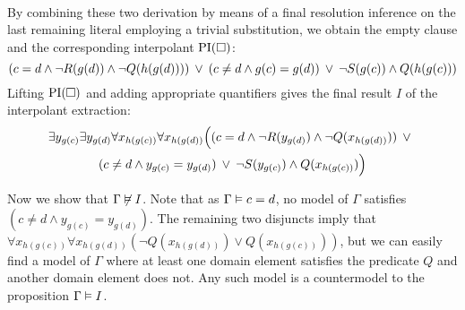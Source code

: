 \begin{exa}
{\begin{adjustwidth}{-1.5em}{0em}
\begin{prooftree}


		\end{prooftree}

		\end{adjustwidth}
	}
		~

	By combining these two derivation by means of a final resolution inference on the last remaining literal employing a trivial substitution, we obtain the empty clause and the corresponding interpolant $\operatorname{PI}(\square)$:
	\[
	(c=d \land \lnot R(g(d)) \land \lnot Q(h(g(d)))) \;\,{\lor}\;\, (c\neq d \land g(c) = g(d))  \;\,{\lor}\;\,\allowbreak
{\lnot S(g(c)) \land Q(h(g(c)))}\]
	Lifting $\operatorname{PI}(\square)$ and adding appropriate quantifiers gives the final result $I$ of the interpolant extraction:
	\begin{gather*}
		\exists y_{g(c)} \exists y_{g(d)} \forall x_{h(g(c))} \forall x_{h(g(d))} 
		\Big(
		(c=d \land \lnot R(y_{g(d)}) \land \lnot Q(x_{h(g(d))})) \;\,{\lor}\;\, \\
		(c\neq d \land y_{g(c)} = y_{g(d)})  \;\,{\lor}\;\,
		{\lnot S(y_{g(c)}) \land Q(x_{h(g(c))})}
		\Big)
	\end{gather*}

	Now we show that $\Gamma \not\vDash I$.
	Note that as $\Gamma \vDash c=d$, no model of $\Gamma$ satisfies $(c\neq d \land y_{g(c)} = y_{g(d)})$.
	The remaining two disjuncts imply that 
	$\forall x_{h(g(c))} \forall x_{h(g(d))} ( \lnot Q(x_{h(g(d))}) \lor Q(x_{h(g(c))}))$,
	but we can easily find a model of $\Gamma$ where at least one domain element satisfies the predicate $Q$ and another domain element does not.
	Any such model is a countermodel to the proposition $\Gamma \vDash I$.
\end{exa}




